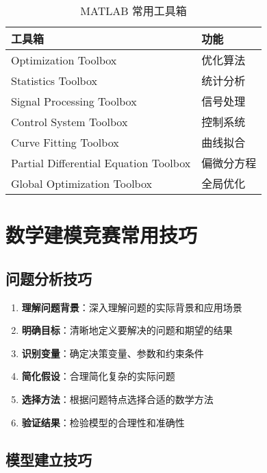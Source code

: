 \begin{table}[htbp]
    \centering
    \caption{MATLAB 常用工具箱}
    \label{tab:matlab-toolboxes}
    \begin{tabular}{@{}ll@{}}
        \toprule
        工具箱 & 功能 \\
        \midrule
        Optimization Toolbox & 优化算法 \\
        Statistics Toolbox & 统计分析 \\
        Signal Processing Toolbox & 信号处理 \\
        Control System Toolbox & 控制系统 \\
        Curve Fitting Toolbox & 曲线拟合 \\
        Partial Differential Equation Toolbox & 偏微分方程 \\
        Global Optimization Toolbox & 全局优化 \\
        \bottomrule
    \end{tabular}
\end{table}

\section{数学建模竞赛常用技巧}\label{app:modeling-tips}

\subsection{问题分析技巧}

\begin{successbox}[title=问题分析的一般步骤]
\begin{enumerate}
    \item \textbf{理解问题背景}：深入理解问题的实际背景和应用场景
    \item \textbf{明确目标}：清晰地定义要解决的问题和期望的结果
    \item \textbf{识别变量}：确定决策变量、参数和约束条件
    \item \textbf{简化假设}：合理简化复杂的实际问题
    \item \textbf{选择方法}：根据问题特点选择合适的数学方法
    \item \textbf{验证结果}：检验模型的合理性和准确性
\end{enumerate}
\end{successbox}

\subsection{模型建立技巧}

